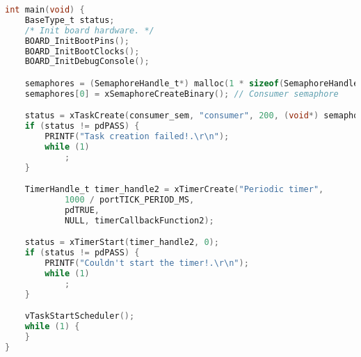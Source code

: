 \begin{lstlisting}[language=c,caption=Problem 6 Producer Task, label=list:p6_main]
int main(void) {
    BaseType_t status;
    /* Init board hardware. */
    BOARD_InitBootPins();
    BOARD_InitBootClocks();
    BOARD_InitDebugConsole();

    semaphores = (SemaphoreHandle_t*) malloc(1 * sizeof(SemaphoreHandle_t));
    semaphores[0] = xSemaphoreCreateBinary(); // Consumer semaphore

    status = xTaskCreate(consumer_sem, "consumer", 200, (void*) semaphores, 2, NULL);
    if (status != pdPASS) {
        PRINTF("Task creation failed!.\r\n");
        while (1)
            ;
    }

    TimerHandle_t timer_handle2 = xTimerCreate("Periodic timer",
            1000 / portTICK_PERIOD_MS,
            pdTRUE,
            NULL, timerCallbackFunction2);

    status = xTimerStart(timer_handle2, 0);
    if (status != pdPASS) {
        PRINTF("Couldn't start the timer!.\r\n");
        while (1)
            ;
    }

    vTaskStartScheduler();
    while (1) {
    }
}
\end{lstlisting}
